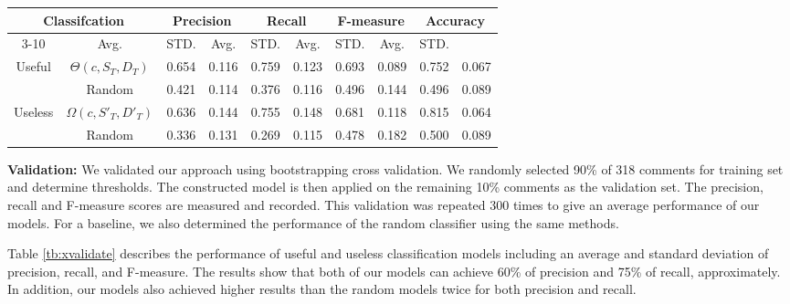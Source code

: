\begin{table*}[!t]
\caption{Results from bootstrapping cross validation of our classification models against random models}
\small
\centering
\def\arraystretch{1.2}
\begin{tabular}{cccc|cc|cc|cc}
\hline
\multicolumn{2}{c}{Classifcation}   & \multicolumn{2}{c|}{Precision} & \multicolumn{2}{c|}{Recall} & \multicolumn{2}{c|}{F-measure} & \multicolumn{2}{c}{Accuracy} \\ \cline{3-10}
\multicolumn{2}{c}{Models} & Avg. & STD. & Avg. & STD. & Avg. & STD. & Avg. & STD. \\ \hline \hline
\multirow{2}{*}{Useful} & $\Theta(c,S_T,D_T)$    &  0.654 & 0.116 &  0.759 & 0.123 & 0.693 & 0.089 & 0.752 & 0.067 \\ \cline{2-10}
& Random     &  0.421 & 0.114 &  0.376 & 0.116 & 0.496 & 0.144 & 0.496 & 0.089 \\ \hline
\multirow{2}{*}{Useless}  & $\Omega(c,S'_T,D'_T)$  &  0.636 & 0.144 &  0.755 & 0.148 & 0.681 & 0.118 & 0.815 & 0.064 \\ \cline{2-10}
& Random    &  0.336 & 0.131 &  0.269 & 0.115 & 0.478 & 0.182 & 0.500 & 0.089 \\
\hline
\end{tabular}
\label{tb:xvalidate}
\end{table*}


\textbf{Validation:}
We validated our approach using bootstrapping cross validation.
We randomly selected 90\% of 318 comments for training set and determine thresholds.
The constructed model is then applied on the remaining 10\% comments as the validation set.
The precision, recall and F-measure scores are measured and recorded.
This validation was repeated 300 times to give an average performance of our models.
For a baseline, we also determined the performance of the random classifier using the same methods.

Table \ref{tb:xvalidate} describes the performance of useful and useless classification models including an average and standard deviation of precision, recall, and F-measure.
The results show that both of our models can achieve 60\% of precision and 75\% of recall, approximately.
In addition, our models also achieved higher results than the random models twice for both precision and recall.





